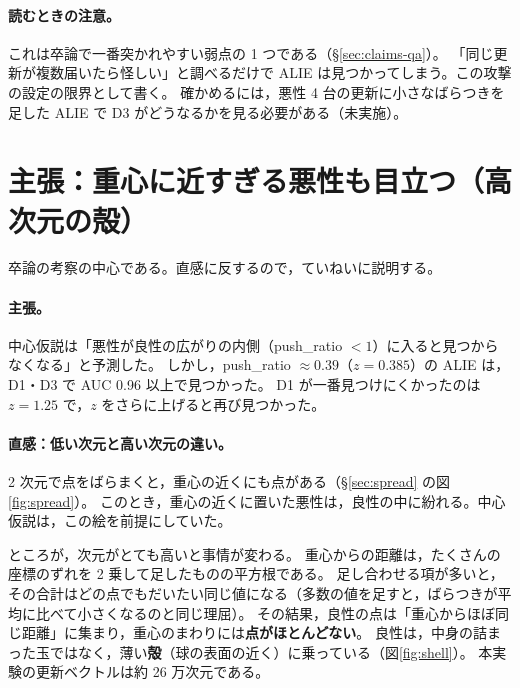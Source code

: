 \documentclass[a4j, dvipdfmx]{jsarticle}  %
\begin{document}
\paragraph{読むときの注意。}
これは卒論で一番突かれやすい弱点の 1 つである（\S\ref{sec:claims-qa}）。
「同じ更新が複数届いたら怪しい」と調べるだけで ALIE は見つかってしまう。この攻撃の設定の限界として書く。
確かめるには，悪性 4 台の更新に小さなばらつきを足した ALIE で D3 がどうなるかを見る必要がある（未実施）。

\section{主張：重心に近すぎる悪性も目立つ（高次元の殻）}
\label{sec:claim-shell}

卒論の考察の中心である。直感に反するので，ていねいに説明する。

\paragraph{主張。}
中心仮説は「悪性が良性の広がりの内側（push\_ratio $< 1$）に入ると見つからなくなる」と予測した。
しかし，push\_ratio $\approx 0.39$（$z = 0.385$）の ALIE は，D1・D3 で AUC 0.96 以上で見つかった。
D1 が一番見つけにくかったのは $z = 1.25$ で，$z$ をさらに上げると再び見つかった。

\paragraph{直感：低い次元と高い次元の違い。}
2 次元で点をばらまくと，重心の近くにも点がある（\S\ref{sec:spread} の図\ref{fig:spread}）。
このとき，重心の近くに置いた悪性は，良性の中に紛れる。中心仮説は，この絵を前提にしていた。

ところが，次元がとても高いと事情が変わる。
重心からの距離は，たくさんの座標のずれを 2 乗して足したものの平方根である。
足し合わせる項が多いと，その合計はどの点でもだいたい同じ値になる（多数の値を足すと，ばらつきが平均に比べて小さくなるのと同じ理屈）。
その結果，良性の点は「重心からほぼ同じ距離」に集まり，重心のまわりには\textbf{点がほとんどない}。
良性は，中身の詰まった玉ではなく，薄い\textbf{殻}（球の表面の近く）に乗っている（図\ref{fig:shell}）。
本実験の更新ベクトルは約 26 万次元である。
\end{document}
